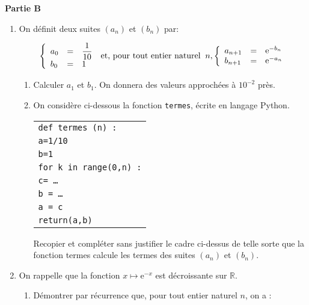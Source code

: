 \documentclass[10pt,a4paper]{article}
\newcommand{\R}{\mathbb{R}}
\begin{document}
\medskip

\textbf{Partie B}

\medskip

\begin{enumerate}
\item On définit deux suites $\left(a_n\right)$ et $\left(b_n\right)$ par:

\[\left\{\begin{array}{l c l}
a_0& =& \dfrac{1}{10}\\
b_0& =& 1
\end{array}\right.\: \text{et, pour tout entier naturel }\: n,\left\{\begin{array}{l c l}
a_{n+1}&=&\text{e}^{-b_n}\\
b_{n+1}&=&\text{e}^{-a_n}
\end{array}\right.\]

	\begin{enumerate}
		\item Calculer $a_1$ et $b_1$. On donnera des valeurs approchées à $10^{-2}$ près.
		\item On considère ci-dessous la fonction \texttt{termes}, écrite en langage Python.
		
\begin{center}

\begin{tabular}{|l|}\hline
\texttt{def termes (n) :}\\
\quad \texttt{a=1/10}\\
\quad \texttt{b=1}\\
\quad \texttt{for k in range(0,n) :}\\
\qquad \texttt{c= \ldots}\\
\qquad \texttt{b  = \ldots}\\
\qquad \texttt{a = c}\\
\quad \texttt{return(a,b)}\\ \hline
\end{tabular}
\end{center}

Recopier et compléter sans justifier le cadre ci-dessus de telle sorte que la fonction termes calcule les termes des suites $\left(a_n\right)$ et $\left(b_n\right)$.
	\end{enumerate}
\item On rappelle que la fonction $x \longmapsto \text{e}^{-x}$ est décroissante sur $\R$.
	\begin{enumerate}
		\item Démontrer par récurrence que, pour tout entier naturel $n$, on a :
		

\end{enumerate}
\end{enumerate}
\end{document}
